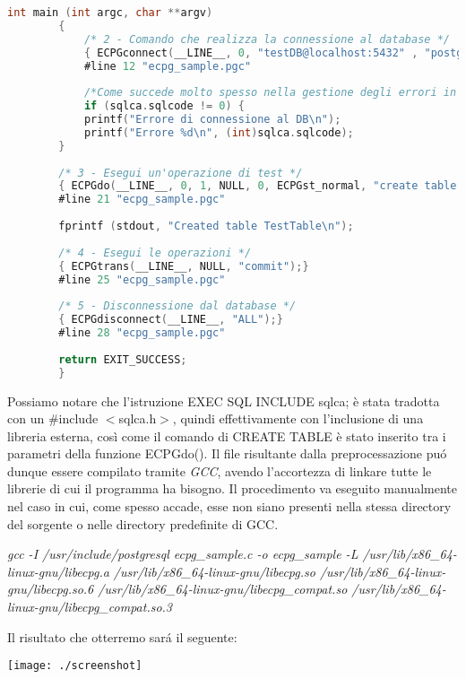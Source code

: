 \documentclass[12pt,a4paper,onecolumn,x11names]{article}
\begin{document}
\begin{lstlisting}[language=C, caption=testECPG.c]
		int main (int argc, char **argv)
		{
			/* 2 - Comando che realizza la connessione al database */
			{ ECPGconnect(__LINE__, 0, "testDB@localhost:5432" , "postgres" , "portento123" , NULL, 0); }
			#line 12 "ecpg_sample.pgc"
			
			/*Come succede molto spesso nella gestione degli errori in linguaggio C, il valore ritornato da una funzione viene utilizzato anche come codice di errore, considerando lo 0 come esecuzione andata a buon fine */
			if (sqlca.sqlcode != 0)	{
			printf("Errore di connessione al DB\n");
			printf("Errore %d\n", (int)sqlca.sqlcode);
		}
		
		/* 3 - Esegui un'operazione di test */
		{ ECPGdo(__LINE__, 0, 1, NULL, 0, ECPGst_normal, "create table TableTest ( number integer , ascii char ( 16 ) )", ECPGt_EOIT, ECPGt_EORT);}
		#line 21 "ecpg_sample.pgc"
		
		fprintf (stdout, "Created table TestTable\n");
		
		/* 4 - Esegui le operazioni */
		{ ECPGtrans(__LINE__, NULL, "commit");}
		#line 25 "ecpg_sample.pgc"
		
		/* 5 - Disconnessione dal database */
		{ ECPGdisconnect(__LINE__, "ALL");}
		#line 28 "ecpg_sample.pgc"
		
		return EXIT_SUCCESS;
		}
		\end{lstlisting}
		\begin{flushleft}
			Possiamo notare che l'istruzione \textsf{EXEC SQL INCLUDE sqlca;} è stata tradotta con un \textsf{\#include $<$sqlca.h$>$}, quindi effettivamente con l'inclusione di una libreria esterna, così come il comando di \textsf{CREATE TABLE} è stato inserito tra i parametri della funzione \textsf{ECPGdo()}.\newline
			Il file risultante dalla preprocessazione pu\'{o} dunque essere compilato tramite \textit{GCC}, avendo l'accortezza di linkare tutte le librerie di cui il programma ha bisogno. Il procedimento va eseguito manualmente nel caso in cui, come spesso accade, esse non siano presenti nella stessa directory del sorgente o nelle directory predefinite di GCC.
		\end{flushleft}
		\begin{center}
			\textit{gcc -I /usr/include/postgresql ecpg\_sample.c -o ecpg\_sample -L /usr/lib/x86\_64-linux-gnu/libecpg.a /usr/lib/x86\_64-linux-gnu/libecpg.so /usr/lib/x86\_64-linux-gnu/libecpg.so.6 /usr/lib/x86\_64-linux-gnu/libecpg\_compat.so /usr/lib/x86\_64-linux-gnu/libecpg\_compat.so.3}
		\end{center}
		\begin{flushleft}
			Il risultato che otterremo sar\'{a} il seguente:
		\end{flushleft}
		\begin{center}
			\texttt{[image: ./screenshot]}
		\end{center}
		
\end{document}
